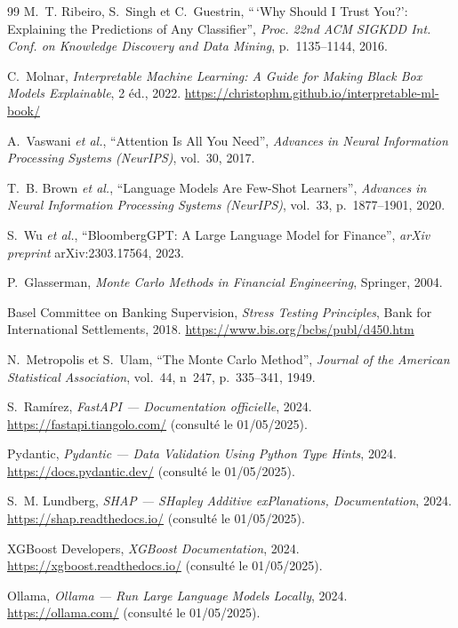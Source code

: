 \documentclass[a4paper,12pt,oneside]{report}
\begin{document}
\begin{thebibliography}{99}
 M.~T. Ribeiro, S.~Singh et C.~Guestrin, ``\,`Why Should I Trust You?':
  Explaining the Predictions of Any Classifier'', \emph{Proc. 22nd ACM SIGKDD Int. Conf. on
  Knowledge Discovery and Data Mining}, p.~1135--1144, 2016.

 C.~Molnar, \emph{Interpretable Machine Learning: A Guide for Making Black
  Box Models Explainable}, 2 éd., 2022. \url{https://christophm.github.io/interpretable-ml-book/}

 A.~Vaswani \textit{et al.}, ``Attention Is All You Need'',
  \emph{Advances in Neural Information Processing Systems (NeurIPS)}, vol.~30, 2017.

 T.~B. Brown \textit{et al.}, ``Language Models Are Few-Shot Learners'',
  \emph{Advances in Neural Information Processing Systems (NeurIPS)}, vol.~33, p.~1877--1901, 2020.

 S.~Wu \textit{et al.}, ``BloombergGPT: A Large Language Model for
  Finance'', \emph{arXiv preprint} arXiv:2303.17564, 2023.

 P.~Glasserman, \emph{Monte Carlo Methods in Financial Engineering},
  Springer, 2004.

 Basel Committee on Banking Supervision, \emph{Stress Testing Principles},
  Bank for International Settlements, 2018. \url{https://www.bis.org/bcbs/publ/d450.htm}

 N.~Metropolis et S.~Ulam, ``The Monte Carlo Method'', \emph{Journal
  of the American Statistical Association}, vol.~44, n~247, p.~335--341, 1949.

 S.~Ramírez, \emph{FastAPI --- Documentation officielle}, 2024.
  \url{https://fastapi.tiangolo.com/} (consulté le 01/05/2025).

 Pydantic, \emph{Pydantic --- Data Validation Using Python Type Hints}, 2024.
  \url{https://docs.pydantic.dev/} (consulté le 01/05/2025).

 S.~M. Lundberg, \emph{SHAP --- SHapley Additive exPlanations, Documentation},
  2024. \url{https://shap.readthedocs.io/} (consulté le 01/05/2025).

 XGBoost Developers, \emph{XGBoost Documentation}, 2024.
  \url{https://xgboost.readthedocs.io/} (consulté le 01/05/2025).

 Ollama, \emph{Ollama --- Run Large Language Models Locally}, 2024.
  \url{https://ollama.com/} (consulté le 01/05/2025).

\end{thebibliography}
\end{document}
